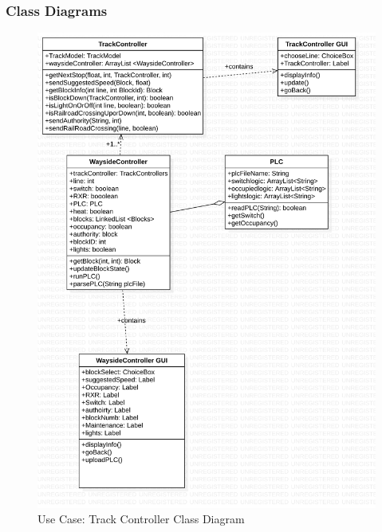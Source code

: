 \documentclass{article}
\begin{document}
    \subsubsection{Class Diagrams}
    \begin{figure}[H]
        \centering
        \includegraphics[width=\textwidth]{./ClassDiagrams/TrackController_ClassDiagram.png}
        \caption{Use Case: Track Controller Class Diagram}
        \label{fig:Track Controller Class Diagram}
    \end{figure}
\end{document}
